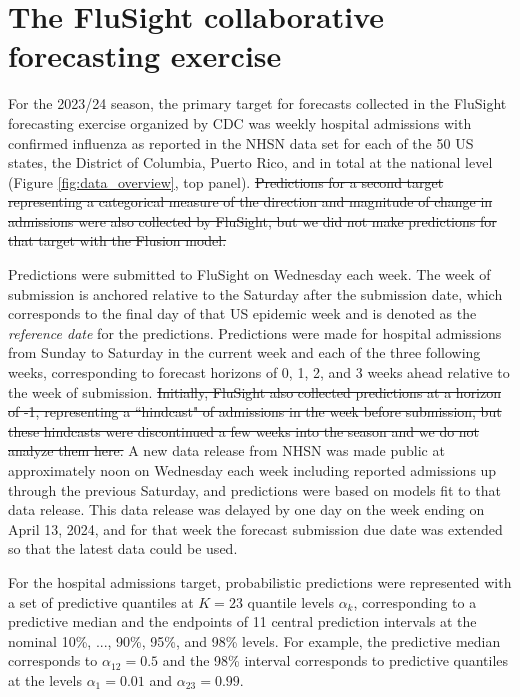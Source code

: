 \documentclass{article}\usepackage[]{graphicx}\usepackage[]{xcolor}
\providecommand{\DIFdeltex}[1]{{\protect\color{red}\sout{#1}}}                      %
\providecommand{\DIFdelbegin}{} %
\providecommand{\DIFdelend}{} %
\providecommand{\DIFdel}[1]{\texorpdfstring{\DIFdeltex{#1}}{}} %
\newcommand{\DIFscaledelfig}{0.5}
\newlength{\DIFdelgraphicswidth} %
\newlength{\DIFdelgraphicsheight} %
\newcommand{\DIFdelincludegraphics}[2][]{%
\sbox{\DIFdelgraphicsbox}{\DIFOincludegraphics[#1]{#2}}%
\settoboxwidth{\DIFdelgraphicswidth}{\DIFdelgraphicsbox} %
\settoboxtotalheight{\DIFdelgraphicsheight}{\DIFdelgraphicsbox} %
\scalebox{\DIFscaledelfig}{%
\parbox[b]{\DIFdelgraphicswidth}{\usebox{\DIFdelgraphicsbox}\\[-\baselineskip] \rule{\DIFdelgraphicswidth}{0em}}\llap{\resizebox{\DIFdelgraphicswidth}{\DIFdelgraphicsheight}{%
\setlength{\unitlength}{\DIFdelgraphicswidth}%
\begin{picture}(1,1)%
\thicklines\linethickness{2pt} %
{\color[rgb]{1,0,0}\put(0,0){\framebox(1,1){}}}%
{\color[rgb]{1,0,0}\put(0,0){\line( 1,1){1}}}%
{\color[rgb]{1,0,0}\put(0,1){\line(1,-1){1}}}%
\end{picture}%
}\hspace*{3pt}}} %
} %
\DeclareRobustCommand{\DIFdelbegin}{\DIFOdelbegin \let\includegraphics\DIFdelincludegraphics} %
\DeclareRobustCommand{\DIFdelend}{\DIFOaddend \let\includegraphics\DIFOincludegraphics} %
\begin{document}
\section{The FluSight collaborative forecasting exercise}
\label{sec:flusight}

For the 2023/24 season, the primary target for forecasts collected in the FluSight forecasting exercise organized by CDC was weekly hospital admissions with confirmed influenza as reported in the NHSN data set for each of the 50 US states, the District of Columbia, Puerto Rico, and in total at the national level (Figure \ref{fig:data_overview}, top panel).
\DIFdelbegin \DIFdel{Predictions for a second target representing a categorical measure of the direction and magnitude of change in admissions were also collected by FluSight, but we did not make predictions for that target with the Flusion model.
}\DIFdelend 

Predictions were submitted to FluSight on Wednesday each week. The week of submission is anchored relative to the Saturday after the submission date, which corresponds to the final day of that US epidemic week and is denoted as the \emph{reference date} for the predictions.
Predictions were made for hospital admissions from Sunday to Saturday in the current week and each of the three following weeks, corresponding to forecast horizons of 0, 1, 2, and 3 weeks ahead relative to the week of submission. \DIFdelbegin \DIFdel{Initially, FluSight also collected predictions at a horizon of -1, representing a ``hindcast" of admissions in the week before submission, but these hindcasts were discontinued a few weeks into the season and we do not analyze them here. }\DIFdelend A new data release from NHSN was made public at approximately noon on Wednesday each week including reported admissions up through the previous Saturday, and predictions were based on models fit to that data release. This data release was delayed by one day on the week ending on April 13, 2024, and for that week the forecast submission due date was extended so that the latest data could be used.

For the hospital admissions target, probabilistic predictions were represented with a set of predictive quantiles at $K = 23$ quantile levels $\alpha_k$, corresponding to a predictive median and the endpoints of 11 central prediction intervals at the nominal 10\%, ..., 90\%, 95\%, and 98\% levels. For example, the predictive median corresponds to $\alpha_{12} = 0.5$ and the 98\% interval corresponds to predictive quantiles at the levels $\alpha_1 = 0.01$ and $\alpha_{23} = 0.99$.
\end{document}
